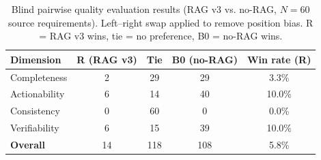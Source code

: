\begin{table}[H]
\caption{Blind pairwise quality evaluation results (RAG v3 vs. no-RAG, $N=60$ source requirements). Left--right swap applied to remove position bias. R = RAG v3 wins, tie = no preference, B0 = no-RAG wins.}
\label{tab:blind_eval}
\begin{tabular}{lcccc}
\toprule
\textbf{Dimension} & \textbf{R (RAG v3)} & \textbf{Tie} & \textbf{B0 (no-RAG)} & \textbf{Win rate (R)} \\
\midrule
Completeness & 2 & 29 & 29 & 3.3\% \\
Actionability & 6 & 14 & 40 & 10.0\% \\
Consistency & 0 & 60 & 0 & 0.0\% \\
Verifiability & 6 & 15 & 39 & 10.0\% \\
\midrule
\textbf{Overall} & 14 & 118 & 108 & 5.8\% \\
\bottomrule
\end{tabular}
\end{table}